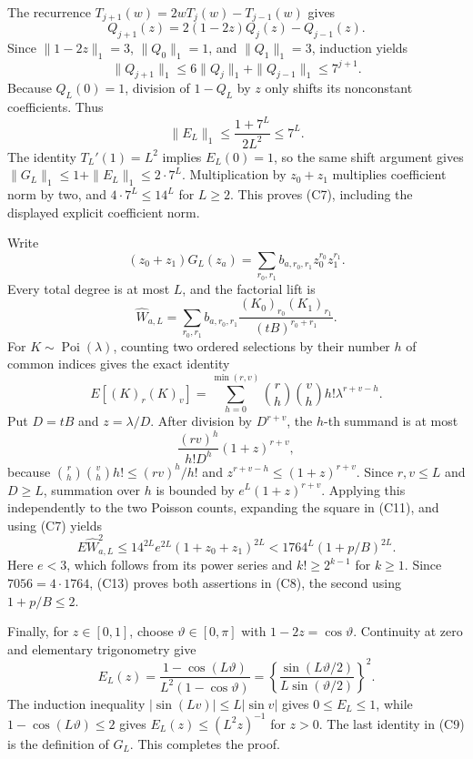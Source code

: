 The recurrence \(T_{j+1}(w)=2wT_j(w)-T_{j-1}(w)\) gives
\[
 Q_{j+1}(z)=2(1-2z)Q_j(z)-Q_{j-1}(z).
\]
Since \(\|1-2z\|_1=3\), \(\|Q_0\|_1=1\), and \(\|Q_1\|_1=3\), induction yields
\[
 \|Q_{j+1}\|_1\le6\|Q_j\|_1+\|Q_{j-1}\|_1\le7^{j+1}.             \tag{C10}
\]
Because \(Q_L(0)=1\), division of \(1-Q_L\) by \(z\) only shifts its nonconstant coefficients.  Thus
\[
 \|E_L\|_1\le\frac{1+7^L}{2L^2}\le7^L.
\]
The identity \(T_L'(1)=L^2\) implies \(E_L(0)=1\), so the same shift argument gives \(\|G_L\|_1\le1+\|E_L\|_1\le2\cdot7^L\).  Multiplication by \(z_0+z_1\) multiplies coefficient norm by two, and \(4\cdot7^L\le14^L\) for \(L\ge2\).  This proves (C7), including the displayed explicit coefficient norm.

Write
\[
 (z_0+z_1)G_L(z_a)=\sum_{r_0,r_1}b_{a,r_0,r_1}z_0^{r_0}z_1^{r_1}.
\]
Every total degree is at most \(L\), and the factorial lift is
\[
 \widehat W_{a,L}=\sum_{r_0,r_1}b_{a,r_0,r_1}
 \frac{(K_0)_{r_0}(K_1)_{r_1}}{(tB)^{r_0+r_1}}.                    \tag{C11}
\]
For \(K\sim\operatorname{Poi}(\lambda)\), counting two ordered selections by their number \(h\) of common indices gives the exact identity
\[
 E[(K)_r(K)_v]=\sum_{h=0}^{\min(r,v)}\binom rh\binom vh h!\lambda^{r+v-h}. \tag{C12}
\]
Put \(D=tB\) and \(z=\lambda/D\).  After division by \(D^{r+v}\), the \(h\)-th summand is at most
\[
 \frac{(rv)^h}{h!D^h}(1+z)^{r+v},
\]
because \(\binom rh\binom vh h!\le(rv)^h/h!\) and \(z^{r+v-h}\le(1+z)^{r+v}\).  Since \(r,v\le L\) and \(D\ge L\), summation over \(h\) is bounded by \(e^L(1+z)^{r+v}\).  Applying this independently to the two Poisson counts, expanding the square in (C11), and using (C7) yields
\[
 E\widehat W_{a,L}^{2}
 \le14^{2L}e^{2L}(1+z_0+z_1)^{2L}
 <1764^L(1+p/B)^{2L}.                                               \tag{C13}
\]
Here \(e<3\), which follows from its power series and \(k!\ge2^{k-1}\) for \(k\ge1\).  Since \(7056=4\cdot1764\), (C13) proves both assertions in (C8), the second using \(1+p/B\le2\).

Finally, for \(z\in[0,1]\), choose \(\vartheta\in[0,\pi]\) with \(1-2z=\cos\vartheta\).  Continuity at zero and elementary trigonometry give
\[
 E_L(z)=\frac{1-\cos(L\vartheta)}{L^2(1-\cos\vartheta)}
 =\left\{\frac{\sin(L\vartheta/2)}{L\sin(\vartheta/2)}\right\}^{\!2}.
\]
The induction inequality \(|\sin(Lv)|\le L|\sin v|\) gives \(0\le E_L\le1\), while \(1-\cos(L\vartheta)\le2\) gives \(E_L(z)\le(L^2z)^{-1}\) for \(z>0\).  The last identity in (C9) is the definition of \(G_L\).  This completes the proof.


